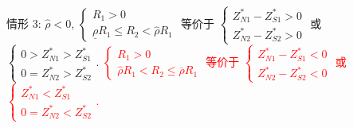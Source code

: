 \documentclass[10.0pt]{article}
\newcommand{\hhred}{\textcolor{red}}
\begin{document}
情形 3: $ {\hat \rho} < 0 $, $ \left\{ \begin{matrix} R_1 > 0 \\ \underline{\rho} R_1 \leqslant R_2 < {\hat \rho} R_1 \end{matrix} \right. $ 等价于 $ \left\{ \begin{matrix} Z_{N 1}^* - Z_{S 1}^* > 0 \\ Z_{N 2}^* - Z_{S 2}^* > 0 \end{matrix} \right. $ 或 $ \left\{ \begin{matrix} 0 > Z_{N 1}^* > Z_{S 1}^* \\ 0 = Z_{N 2}^* > Z_{S 2}^* \end{matrix} \right. $.
\hhred{$ \left\{ \begin{matrix} R_1 > 0 \\ {\hat \rho} R_1 < R_2 \leqslant \overline{\rho} R_1 \end{matrix} \right. $ 等价于 $ \left\{ \begin{matrix} Z_{N 1}^* - Z_{S 1}^* < 0 \\ Z_{N 2}^* - Z_{S 2}^* < 0 \end{matrix} \right. $ 或 $ \left\{ \begin{matrix} Z_{N 1}^* < Z_{S 1}^* \\ 0 = Z_{N 2}^* < Z_{S 2}^* \end{matrix} \right. $.}
\end{document}
